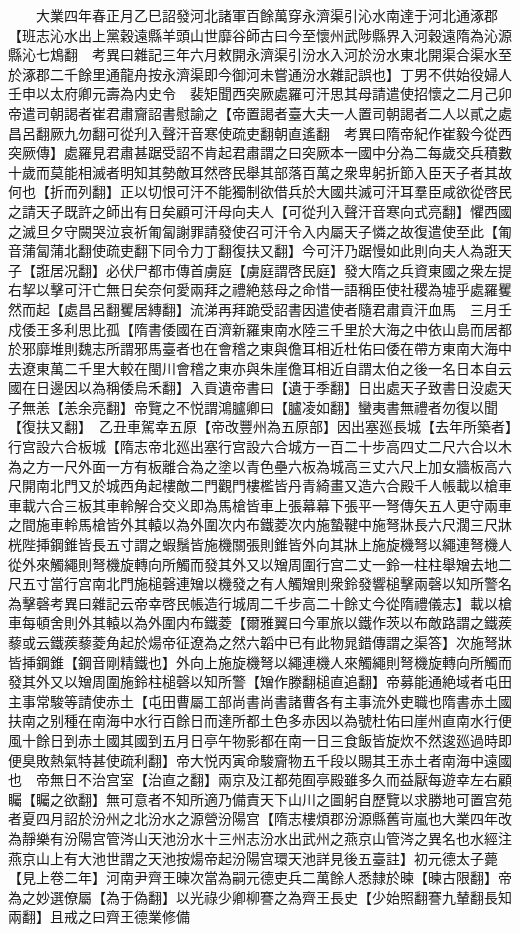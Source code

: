 　　大業四年春正月乙巳詔發河北諸軍百餘萬穿永濟渠引沁水南達于河北通涿郡【班志沁水出上黨穀遠縣羊頭山世靡谷師古曰今至懷州武陟縣界入河穀遠隋為沁源縣沁七鴆翻　考異曰雜記三年六月敕開永濟渠引汾水入河於汾水東北開渠合渠水至於涿郡二千餘里通龍舟按永濟渠即今御河未嘗通汾水雜記誤也】丁男不供始役婦人　壬申以太府卿元壽為内史令　裴矩聞西突厥處羅可汗思其母請遣使招懷之二月己卯帝遣司朝謁者崔君肅齎詔書慰諭之【帝置謁者臺大夫一人置司朝謁者二人以貳之處昌呂翻厥九勿翻可從刋入聲汗音寒使疏吏翻朝直遙翻　考異曰隋帝紀作崔毅今從西突厥傳】處羅見君肅甚踞受詔不肯起君肅謂之曰突厥本一國中分為二每歲交兵積數十歲而莫能相滅者明知其勢敵耳然啓民舉其部落百萬之衆卑躬折節入臣天子者其故何也【折而列翻】正以切恨可汗不能獨制欲借兵於大國共滅可汗耳羣臣咸欲從啓民之請天子既許之師出有日矣顧可汗母向夫人【可從刋入聲汗音寒向式亮翻】懼西國之滅旦夕守闕哭泣哀祈匍匐謝罪請發使召可汗令入内屬天子憐之故復遣使至此【匍音蒲匐蒲北翻使疏吏翻下同令力丁翻復扶又翻】今可汗乃踞慢如此則向夫人為誑天子【誑居况翻】必伏尸都市傳首虜庭【虜庭謂啓民庭】發大隋之兵資東國之衆左提右挈以擊可汗亡無日矣奈何愛兩拜之禮絶慈母之命惜一語稱臣使社稷為墟乎處羅矍然而起【處昌呂翻矍居縳翻】流涕再拜跪受詔書因遣使者隨君肅貢汗血馬　三月壬戍倭王多利思比孤【隋書倭國在百濟新羅東南水陸三千里於大海之中依山島而居都於邪靡堆則魏志所謂邪馬臺者也在會稽之東與儋耳相近杜佑曰倭在帶方東南大海中去遼東萬二千里大較在閩川會稽之東亦與朱崖儋耳相近自謂太伯之後一名日本自云國在日邊因以為稱倭烏禾翻】入貢遺帝書曰【遺于季翻】日出處天子致書日没處天子無恙【恙余亮翻】帝覽之不悦謂鴻臚卿曰【臚凌如翻】蠻夷書無禮者勿復以聞【復扶又翻】　乙丑車駕幸五原【帝改豐州為五原部】因出塞廵長城【去年所築者】行宫設六合板城【隋志帝北廵出塞行宫設六合城方一百二十步高四丈二尺六合以木為之方一尺外面一方有板離合為之塗以青色壘六板為城高三丈六尺上加女牆板高六尺開南北門又於城西角起樓敵二門觀門樓檻皆丹青綺畫又造六合殿千人帳載以槍車車載六合三板其車軨解合交义即為馬槍皆車上張幕幕下張平一弩傳矢五人更守兩車之間施車軨馬槍皆外其轅以為外圍次内布鐵菱次内施蟄鞬中施弩牀長六尺濶三尺牀桄陛挿鋼錐皆長五寸謂之蝦鬚皆施機關張則錐皆外向其牀上施旋機弩以繩連弩機人從外來觸繩則弩機旋轉向所觸而發其外又以矰周圍行宫二丈一鈴一柱柱舉矰去地二尺五寸當行宫南北門施槌磬連矰以機發之有人觸矰則衆鈴發響槌擊兩磬以知所警名為擊磬考異曰雜記云帝幸啓民帳造行城周二千步高二十餘丈今從隋禮儀志】載以槍車每頓舍則外其轅以為外圍内布鐵菱【爾雅翼曰今軍旅以鐵作茨以布敵路謂之鐵蒺藜或云鐵蒺藜菱角起於煬帝征遼為之然六韜中已有此物晁錯傳謂之渠答】次施弩牀皆挿鋼錐【鋼音剛精鐵也】外向上施旋機弩以繩連機人來觸繩則弩機旋轉向所觸而發其外又以矰周圍施鈴柱槌磬以知所警【矰作滕翻槌直追翻】帝募能通絶域者屯田主事常駿等請使赤土【屯田曹屬工部尚書尚書諸曹各有主事流外吏職也隋書赤土國扶南之别種在南海中水行百餘日而達所都土色多赤因以為號杜佑曰崖州直南水行便風十餘日到赤土國其國到五月日亭午物影都在南一日三食飯皆旋炊不然逡廵過時即便臭敗熱氣特甚使疏利翻】帝大悦丙寅命駿齎物五千段以賜其王赤土者南海中遠國也　帝無日不治宫室【治直之翻】兩京及江都苑囿亭殿雖多久而益厭每遊幸左右顧矚【矚之欲翻】無可意者不知所適乃備責天下山川之圖躬自歷覽以求勝地可置宫苑者夏四月詔於汾州之北汾水之源營汾陽宫【隋志樓煩郡汾源縣舊岢嵐也大業四年改為靜樂有汾陽宫管涔山天池汾水十三州志汾水出武州之燕京山管涔之異名也水經注燕京山上有大池世謂之天池按煬帝起汾陽宫環天池詳見後五臺註】初元德太子薨【見上卷二年】河南尹齊王暕次當為嗣元德吏兵二萬餘人悉隸於暕【暕古限翻】帝為之妙選僚屬【為于偽翻】以光祿少卿柳謇之為齊王長史【少始照翻謇九輦翻長知兩翻】且戒之曰齊王德業修備